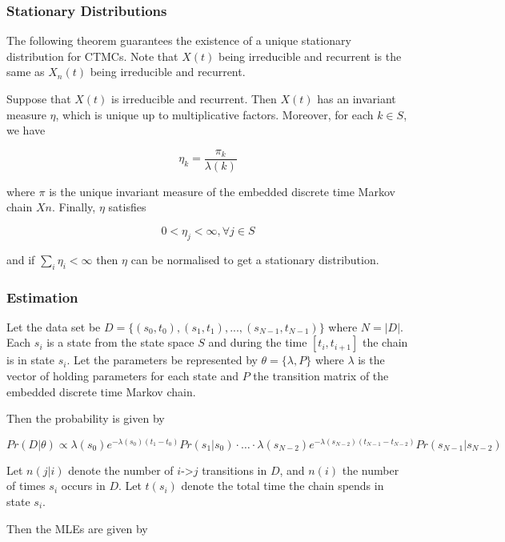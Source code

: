 \documentclass[article,nojss]{jss}
\begin{document}
\hypertarget{stationary-distributions}{%
\subsubsection{Stationary Distributions}\label{stationary-distributions}}

The following theorem guarantees the existence of a unique stationary distribution for CTMCs. Note that \(X(t)\) being irreducible and recurrent is the same as \(X_n(t)\) being irreducible and recurrent.

Suppose that \(X(t)\) is irreducible and recurrent. Then \(X(t)\) has an invariant measure \(\eta\), which is unique up to multiplicative factors. Moreover, for each \(k \in S\), we have

\[\eta_k = \frac{\pi_k}{\lambda(k)}\]

where \(\pi\) is the unique invariant measure of the embedded discrete time Markov chain \(Xn\). Finally, \(\eta\) satisfies

\[0 < \eta_j < \infty, \forall j \in S\]

and if \(\sum_i \eta_i < \infty\) then \(\eta\) can be normalised to get a stationary distribution.

\hypertarget{estimation-1}{%
\subsubsection{Estimation}\label{estimation-1}}

Let the data set be \(D = \{(s_0, t_0), (s_1, t_1), ..., (s_{N-1}, t_{N-1})\}\) where \(N=|D|\). Each \(s_i\) is a state from the state space \(S\) and during the time \([t_i,t_{i+1}]\) the chain is in state \(s_i\). Let the parameters be represented by \(\theta = \{\lambda, P\}\) where \(\lambda\) is the vector of holding parameters for each state and \(P\) the transition matrix of the embedded discrete time Markov chain.

Then the probability is given by

\[
{Pr(D | \theta) \propto \lambda(s_0)e^{-\lambda(s_0)(t_1-t_0)}Pr(s_1|s_0) \cdot\ldots\cdot \lambda(s_{N-2})e^{-\lambda(s_{N-2})(t_{N-1}-t_{N-2})}Pr(s_{N-1}|s_{N-2})}
\]

Let \(n(j|i)\) denote the number of \(i\)-\textgreater{}\(j\) transitions in \(D\), and \(n(i)\) the number of times \(s_i\) occurs in \(D\). Let \(t(s_i)\) denote the total time the chain spends in state \(s_i\).

Then the MLEs are given by
\end{document}
